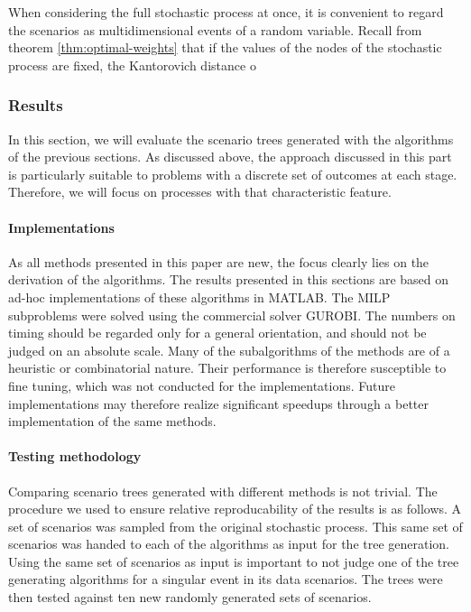 When considering the full stochastic process at once, it is convenient to regard the scenarios as multidimensional events of a random variable. 
Recall from theorem \ref{thm:optimal-weights} that if the values of the nodes of the stochastic process are fixed, the Kantorovich distance o
\subsubsection{Results}
In this section, we will evaluate the scenario trees generated with the algorithms of the previous sections. As discussed above, the approach discussed in this part is particularly suitable to problems with a discrete set of outcomes at each stage. Therefore, we will focus on processes with that characteristic feature.
%
\paragraph{Implementations}
As all methods presented in this paper are new, the focus clearly lies on the derivation of the algorithms.
The results presented in this sections are based on ad-hoc implementations of these algorithms in MATLAB.
The MILP subproblems were solved using the commercial solver GUROBI.
The numbers on timing should be regarded only for a general orientation, and should not be judged on an absolute scale.
Many of the subalgorithms of the methods are of a heuristic or combinatorial nature.
Their performance is therefore susceptible to fine tuning, which was not conducted for the implementations.
Future implementations may therefore realize significant speedups through a better implementation of the same methods.
%
\paragraph{Testing methodology} 
Comparing scenario trees generated with different methods is not trivial.
The procedure we used to ensure relative reproducability of the results is as follows.
A set of scenarios was sampled from the original stochastic process.
This same set of scenarios was handed to each of the algorithms as input for the tree generation.
Using the same set of scenarios as input is important to not judge one of the tree generating algorithms for a singular event in its data scenarios.
The trees were then tested against ten new randomly generated sets of scenarios.
